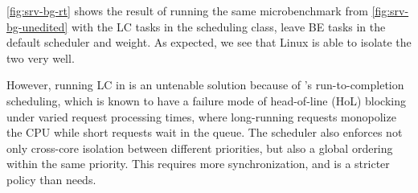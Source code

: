 \autoref{fig:srv-bg-rt} shows the result of running the same microbenchmark from
\autoref{fig:srv-bg-unedited} with the LC tasks in the \fifoclass{} scheduling
class, leave BE tasks in the default \normalclass{} scheduler and weight. As
expected, we see that Linux is able to isolate the two very well.

However, running LC in \fifoclass{} is an untenable solution because of
\fifoclass{}'s run-to-completion scheduling, which is known to have a failure
mode of head-of-line (HoL) blocking under varied request processing times, where
long-running requests monopolize the CPU while short requests wait in the queue.
The \fifoclass{} scheduler also enforces not only cross-core isolation between
different priorities, but also a global ordering within the same priority. This
requires more synchronization, and is a stricter policy than \beclass{} needs.



